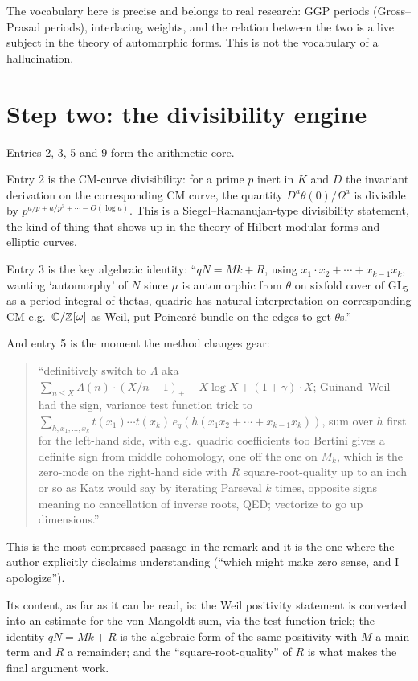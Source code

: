 The vocabulary here is precise and belongs to real research: GGP periods
(Gross--Prasad periods), interlacing weights, and the relation between the two
is a live subject in the theory of automorphic forms. This is not the
vocabulary of a hallucination.

\section{Step two: the divisibility engine}Entries 2, 3, 5 and 9 form the arithmetic core.

Entry 2 is the CM-curve divisibility: for a prime $p$ inert in $K$ and $D$ the
invariant derivation on the corresponding CM curve, the quantity
$D^a\theta(0)/\Omega^a$ is divisible by $p^{a/p + a/p^3 + \cdots - O(\log a)}$.
This is a Siegel--Ramanujan-type divisibility statement, the kind of thing that
shows up in the theory of Hilbert modular forms and elliptic curves.

Entry 3 is the key algebraic identity: ``$qN = Mk + R$, using $x_1\cdot x_2 +
\cdots + x_{k-1}x_k$, wanting `automorphy' of $N$ since $\mu$ is automorphic
from $\theta$ on sixfold cover of GL$_5$ as a period integral of thetas,
quadric has natural interpretation on corresponding CM e.g.\ $\mathbb{C}/\mathbb{Z}[\omega]$ as
Weil, put Poincar\'e bundle on the edges to get $\theta$s.''

And entry 5 is the moment the method changes gear:

\begin{quote}
\small
``definitively switch to $\Lambda$ aka $\sum_{n \le X}\Lambda(n)\cdot (X/n -
1)_+ - X\log X + (1+\gamma)\cdot X$; Guinand--Weil had the sign, variance test
function trick to $\sum_{h,x_1,\dots,x_k} t(x_1)\cdots t(x_k)\,e_q(h(x_1x_2 +
\cdots + x_{k-1}x_k))$, sum over $h$ first for the left-hand side, with
e.g.\ quadric coefficients too Bertini gives a definite sign from middle
cohomology, one off the one on $M_k$, which is the zero-mode on the right-hand
side with $R$ square-root-quality up to an inch or so as Katz would say by
iterating Parseval $k$ times, opposite signs meaning no cancellation of inverse
roots, QED; vectorize to go up dimensions.''
\end{quote}

This is the most compressed passage in the remark and it is the one where the
author explicitly disclaims understanding (``which might make zero sense, and
I apologize'').

Its content, as far as it can be read, is: the Weil positivity statement is
converted into an estimate for the von Mangoldt sum, via the test-function
trick; the identity $qN = Mk + R$ is the algebraic form of the same positivity
with $M$ a main term and $R$ a remainder; and the ``square-root-quality'' of
$R$ is what makes the final argument work.

